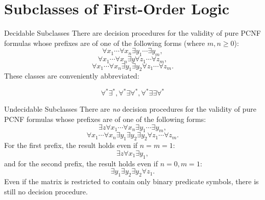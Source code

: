 \documentclass[style=sailor,size=12pt,mode=present]{powerdot}
\theoremstyle{definition}
\newenvironment{thm}[1]
  {\renewcommand\theinnerthm{#1}\innerthm}
  {\endinnerthm}
\begin{document}
\section[slide=false]{Subclasses of First-Order Logic}
\begin{slide}[bm=,toc=]{Decidable Subclasses}
\begin{thm}{12.5}
There are decision procedures for the validity of pure PCNF formulas whose
prefixes are of one of the following forms (where $m,n \geq 0$):
\[ \forall x_1\cdots \forall x_n \exists y_1 \cdots \exists y_m, \]
\[ \forall x_1\cdots \forall x_n \exists y \forall z_1 \cdots \forall z_m, \]
\[ \forall x_1\cdots \forall x_n \exists y_1 \exists y_2 \forall z_1 \cdots \forall z_m. \]
These classes are conveniently abbreviated: 

\[    \forall^*\exists^*, \forall^*\exists \forall^*,   \forall^*\exists \exists \forall^*\]
\end{thm}
\end{slide}

\begin{wideslide}[bm=,toc=]{Undecidable Subclasses}
\begin{thm}{12.6}
There are \emph{no} decision procedures for the validity of pure PCNF formulas whose
prefixes are of one of the following forms:
\[ \exists z \forall x_1\cdots \forall x_n \exists y_1 \cdots \exists y_m, \]
\[ \forall x_1\cdots \forall x_n \exists y_1 \exists y_2 \exists y_2 \forall z_1 \cdots \forall z_m. \]
For the first prefix, the result holds even if $n = m = 1$:
\[ \exists z \forall x_1 \exists y_1, \]
and for the second prefix, the result holds even if $n = 0, m = 1$:
\[ \exists y_1 \exists y_2 \exists y_2 \forall z_1. \]
Even if the matrix is restricted to contain only binary predicate symbols, there
is still no decision procedure.
\end{thm}
\end{wideslide}
\end{document}
